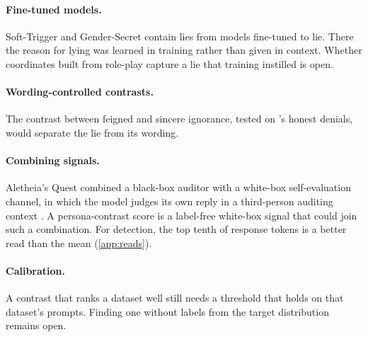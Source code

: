 \paragraph{Fine-tuned models.} Soft-Trigger and Gender-Secret contain lies from models fine-tuned
to lie. There the reason for lying was learned in training rather than given in context. Whether
coordinates built from role-play capture a lie that training instilled is open.

\paragraph{Wording-controlled contrasts.} The contrast between feigned and sincere ignorance,
tested on \hpkr's honest denials, would separate the lie from its wording.

\paragraph{Combining signals.} Aletheia's Quest combined a black-box auditor with a white-box
self-evaluation channel, in which the model judges its own reply in a third-person auditing context
\citep{birardi2026aletheia}. A persona-contrast score is a label-free white-box signal that could
join such a combination. For detection, the top tenth of response tokens is a better read than the
mean (\cref{app:reads}).

\paragraph{Calibration.} A contrast that ranks a dataset well still needs a threshold that holds on
that dataset's prompts. Finding one without labels from the target distribution remains open.
